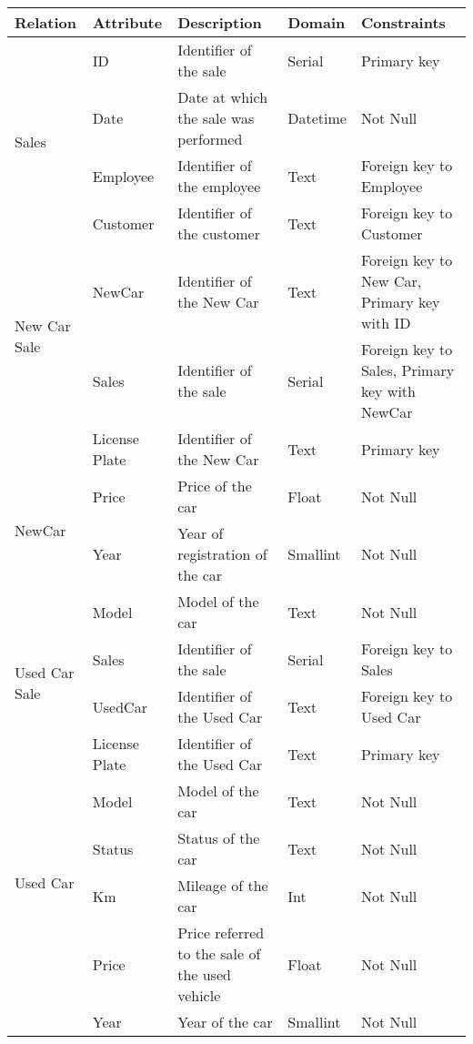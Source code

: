 \begin{longtable}{|p{}|p{} |p{}|p{}|p{} |} 
\hline
\textbf{Relation} & \textbf{Attribute} & \textbf{Description} & \textbf{Domain} & \textbf{Constraints} \\\hline

\multirow{4}{*}{Sales}
    & ID & Identifier of the sale & Serial & Primary key \\\cline{2-5}
    & Date & Date at which the sale was performed & Datetime & Not Null\\\cline{2-5}
    & Employee & Identifier of the employee & Text & Foreign key to Employee\\\cline{2-5}
    & Customer & Identifier of the customer & Text & Foreign key to Customer\\\hline

\multirow{2}{*}{New Car Sale} 
    & NewCar & Identifier of the New Car & Text & Foreign key to New Car, Primary key with ID \\\cline{2-5}
    & Sales & Identifier of the sale & Serial & Foreign key to Sales, Primary key with NewCar\\\hline

\multirow{4}{*}{NewCar}
    & License Plate & Identifier of the New Car & Text & Primary key \\\cline{2-5} 
    & Price & Price of the car & Float & Not Null \\\cline{2-5}
    & Year & Year of registration of the car & Smallint & Not Null \\\cline{2-5}
    & Model & Model of the car & Text & Not Null \\\hline

\multirow{2}{*}{Used Car Sale} 
    & Sales & Identifier of the sale & Serial & Foreign key to Sales\\\cline{2-5}
    & UsedCar & Identifier of the Used Car & Text & Foreign key to Used Car \\ \hline

\multirow{7}{*}{Used Car}
    & License Plate & Identifier of the Used Car & Text & Primary key \\\cline{2-5}
    & Model & Model of the car & Text & Not Null \\\cline{2-5} 
    & Status & Status of the car & Text & Not Null\\\cline{2-5}
    & Km & Mileage of the car & Int & Not Null \\\cline{2-5}
    & Price & Price referred to the sale of the used vehicle & Float & Not Null \\\cline{2-5} 
    & Year & Year of the car & Smallint & Not Null \\ \hline


\end{longtable}
